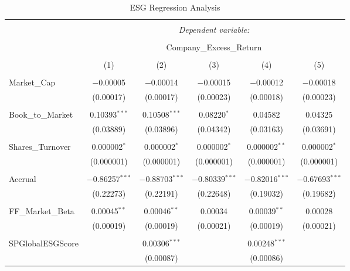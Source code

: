 
\begin{table}[!htbp] \centering 
  \caption{ESG Regression Analysis} 
  \label{} 
\begin{tabular}{@{\extracolsep{5pt}}lccccc} 
\\[-1.8ex]\hline 
\hline \\[-1.8ex] 
 & \multicolumn{5}{c}{\textit{Dependent variable:}} \\ 
\cline{2-6} 
\\[-1.8ex] & \multicolumn{5}{c}{Company\_Excess\_Return} \\ 
\\[-1.8ex] & (1) & (2) & (3) & (4) & (5)\\ 
\hline \\[-1.8ex] 
 Market\_Cap & $-$0.00005 & $-$0.00014 & $-$0.00015 & $-$0.00012 & $-$0.00018 \\ 
  & (0.00017) & (0.00017) & (0.00023) & (0.00018) & (0.00023) \\ 
  & & & & & \\ 
 Book\_to\_Market & 0.10393$^{***}$ & 0.10508$^{***}$ & 0.08220$^{*}$ & 0.04582 & 0.04325 \\ 
  & (0.03889) & (0.03896) & (0.04342) & (0.03163) & (0.03691) \\ 
  & & & & & \\ 
 Shares\_Turnover & 0.000002$^{*}$ & 0.000002$^{*}$ & 0.000002$^{*}$ & 0.000002$^{**}$ & 0.000002$^{*}$ \\ 
  & (0.000001) & (0.000001) & (0.000001) & (0.000001) & (0.000001) \\ 
  & & & & & \\ 
 Accrual & $-$0.86257$^{***}$ & $-$0.88703$^{***}$ & $-$0.80339$^{***}$ & $-$0.82016$^{***}$ & $-$0.67693$^{***}$ \\ 
  & (0.22273) & (0.22191) & (0.22648) & (0.19032) & (0.19682) \\ 
  & & & & & \\ 
 FF\_Market\_Beta & 0.00045$^{**}$ & 0.00046$^{**}$ & 0.00034 & 0.00039$^{**}$ & 0.00028 \\ 
  & (0.00019) & (0.00019) & (0.00021) & (0.00019) & (0.00021) \\ 
  & & & & & \\ 
 SPGlobalESGScore &  & 0.00306$^{***}$ &  & 0.00248$^{***}$ &  \\ 
  &  & (0.00087) &  & (0.00086) &  \\ 

\end{tabular}
\end{table}
